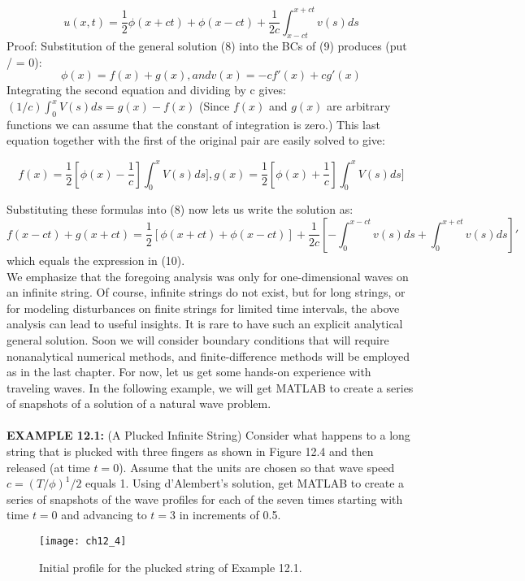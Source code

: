 \documentclass[../main.tex]{subfiles}
\begin{document}
\begin{equation}
u(x,t)=\dfrac{1}{2} \phi(x+ct)+\phi(x-ct)+\dfrac{1}{2c} \int_{x-ct}^{x+ct} v(s)ds
\end{equation}
Proof: Substitution of the general solution (8) into the BCs of (9) produces (put /
= 0): 
$$\phi(x)=f(x)+g(x), and v(x)=-cf'(x)+cg'(x)$$
Integrating the second equation and dividing by c gives:$(1/c) \int_{0}^{x} V(s)ds=g(x)-f(x)$
(Since $f(x)$ and $g(x)$ are arbitrary functions we can assume that the
constant of integration is zero.) This last equation together with the first of the
original pair are easily solved to give:

$$f(x)=\dfrac{1}{2}[\phi(x)-\dfrac{1}{c}] \int_{0}^{x} V(s)ds] , g(x)=\dfrac{1}{2}[\phi(x)+\dfrac{1}{c}] \int_{0}^{x} V(s)ds]$$

Substituting these formulas into (8) now lets us write the solution as: 
$$f(x-ct) + g(x + ct)=\dfrac{1}{2} [\phi(x+ct)+\phi(x-ct)]+\dfrac{1}{2c} [-\int_{0}^{x-ct} v(s)ds+\int_{0}^{x+ct} v(s)ds]'$$
which equals the expression in (10). 
\\

We emphasize that the foregoing analysis was only for one-dimensional waves
on an infinite string. Of course, infinite strings do not exist, but for long strings, or
for modeling disturbances on finite strings for limited time intervals, the above
analysis can lead to useful insights. It is rare to have such an explicit analytical
general solution. Soon we will consider boundary conditions that will require
nonanalytical numerical methods, and finite-difference methods will be employed
as in the last chapter. For now, let us get some hands-on experience with
traveling waves. In the following example, we will get MATLAB to create a
series of snapshots of a solution of a natural wave problem.
\\
\\ 
\textbf{EXAMPLE 12.1:} (A Plucked Infinite String) Consider what happens to a long
string that is plucked with three fingers as shown in Figure 12.4 and then released
(at time $t = 0$). Assume that the units are chosen so that wave speed $c=(T/ \phi)^1/2$ equals 1. Using d'Alembert's solution, get MATLAB to create a series of
snapshots of the wave profiles for each of the seven times starting with time $t = 0$
and advancing to $t = 3$ in increments of 0.5. 
\begin{figure}[H]
	\centering
	\texttt{[image: ch12\_4]}
	\caption{\textsf{ Initial profile for the plucked string of Example 12.1.}}
	\label{pfig:ch12_4}
\end{figure}
\end{document}
